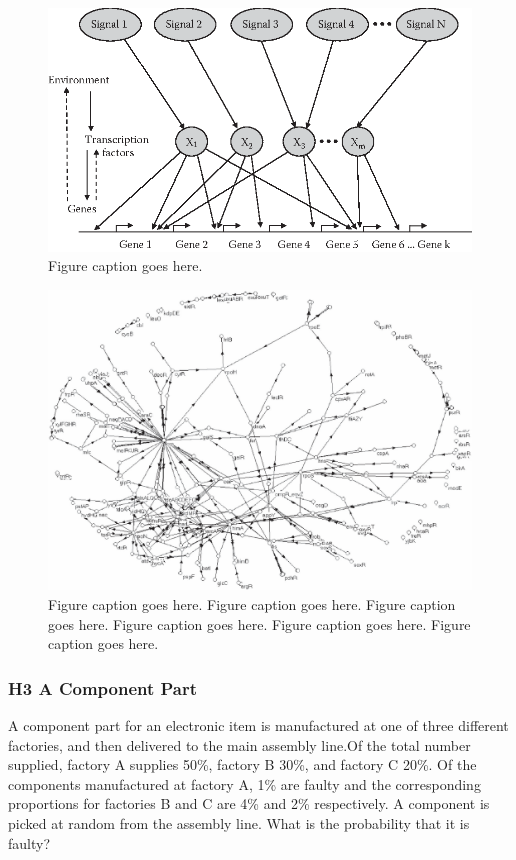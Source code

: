 \begin{figure}\centering
\includegraphics{Chapters/chapter1/figures/002x001.eps}
\caption[List of figure caption goes here]{Figure caption goes here.}
\end{figure}



\begin{figure}[htb]
\centering
\includegraphics[width=\textwidth]{Chapters/chapter1/figures/002x003.eps}
\caption[Short figure caption]{Figure caption goes here. Figure caption goes here.
Figure caption goes here. Figure caption goes here. Figure caption goes here.
Figure caption goes here.}
\end{figure}






\subsubsection{H3 A Component Part }
A component part for an electronic item is
manufactured at one of three \cite{mardia1979ma} different factories, and then delivered to
the main assembly line.Of the total number supplied, factory A supplies
50\%, factory B 30\%, and factory C 20\%. Of the components
manufactured at factory A, 1\% are faulty and the corresponding
proportions for factories B and C are 4\% and 2\% respectively. A
component is picked at random from the assembly line. What is the
probability that it is faulty? 


